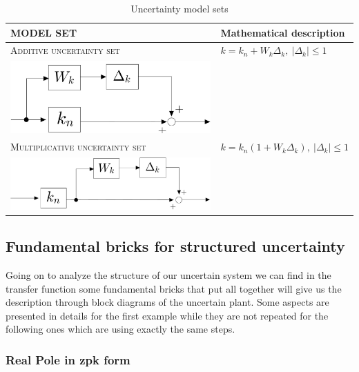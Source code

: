 \documentclass[a4paper, 12pt]{article}
\begin{document}
\begin{table}[h]
    \centering
    \begin{tabular}{p{8cm} p{6cm}}
        \toprule[1pt]
        \textbf{MODEL SET}&\textbf{Mathematical description}\\
        \midrule
        \textsc{Additive uncertainty set}&
        $k=k_n+W_k{\Delta_k}, \ \vert \Delta_k \vert \le 1$
        \\\includegraphics[scale=0.12]{img/add_k.jpg}\\
        \midrule
        \textsc{Multiplicative uncertainty set}&$k=k_n(1+W_k\Delta_k), \ \vert \Delta_k \vert \le1$ \\ \includegraphics[scale=0.14]{img/mul_k.jpg}\\
        \bottomrule[1pt]
    \end{tabular}
    \caption{Uncertainty model sets}
    \label{tab:uncertainty_set}
\end{table}


\subsection{Fundamental bricks for structured uncertainty}
Going on to analyze the structure of our uncertain system we can find in the transfer function some fundamental bricks that put all together will give us the description through block diagrams of the uncertain plant. \textsf{Some aspects are presented in details for the first example while they are not repeated for the following ones which are using exactly the same steps.}

\subsubsection{Real Pole in zpk form}
\end{document}
